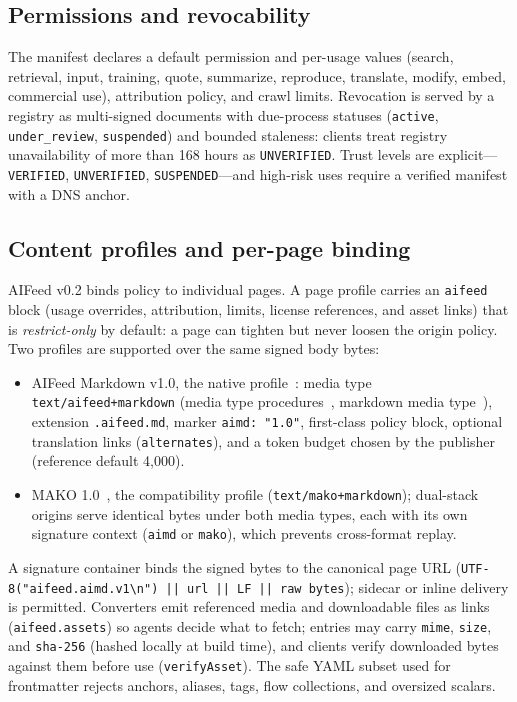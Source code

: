 \documentclass[11pt]{article}
\newcommand{\aifeed}{AIFeed}
\newcommand{\aimd}{AIFeed Markdown}
\newcommand{\mako}{MAKO}
\newcommand{\code}[1]{\texttt{#1}}
\begin{document}
\subsection{Permissions and revocability}

The manifest declares a default permission and per-usage values (search, retrieval,
input, training, quote, summarize, reproduce, translate, modify, embed, commercial use),
attribution policy, and crawl limits. Revocation is served by a registry as multi-signed
documents with due-process statuses (\code{active}, \code{under\_review},
\code{suspended}) and bounded staleness: clients treat registry unavailability of more
than 168 hours as \code{UNVERIFIED}. Trust levels are explicit---\code{VERIFIED},
\code{UNVERIFIED}, \code{SUSPENDED}---and high-risk uses require a verified manifest with
a DNS anchor.

\subsection{Content profiles and per-page binding}

\aifeed{} v0.2 binds policy to individual pages. A page profile carries an \code{aifeed}
block (usage overrides, attribution, limits, license references, and asset links) that is
\emph{restrict-only} by default: a page can tighten but never loosen the origin policy.
Two profiles are supported over the same signed body bytes:

\begin{itemize}
  \item \aimd{} v1.0, the native profile~\citep{aimdSpec}: media type
  \code{text/aifeed+markdown} (media type procedures~\citep{rfc6838}, markdown media
  type~\citep{rfc7763}), extension \code{.aifeed.md}, marker \code{aimd: "1.0"},
  first-class policy block, optional translation links (\code{alternates}), and a token
  budget chosen by the publisher (reference default 4{,}000).
  \item \mako{} 1.0~\citep{makoSpec}, the compatibility profile
  (\code{text/mako+markdown}); dual-stack origins serve identical bytes under both media
  types, each with its own signature context (\code{aimd} or \code{mako}), which prevents
  cross-format replay.
\end{itemize}

A signature container binds the signed bytes to the canonical page URL
(\code{UTF-8("aifeed.aimd.v1\textbackslash n") || url || LF || raw bytes}); sidecar or
inline delivery is permitted. Converters emit referenced media and downloadable files as
links (\code{aifeed.assets}) so agents decide what to fetch; entries may carry
\code{mime}, \code{size}, and \code{sha-256} (hashed locally at build time), and clients
verify downloaded bytes against them before use (\code{verifyAsset}). The safe YAML
subset used for frontmatter rejects anchors, aliases, tags, flow collections, and
oversized scalars.
\end{document}
